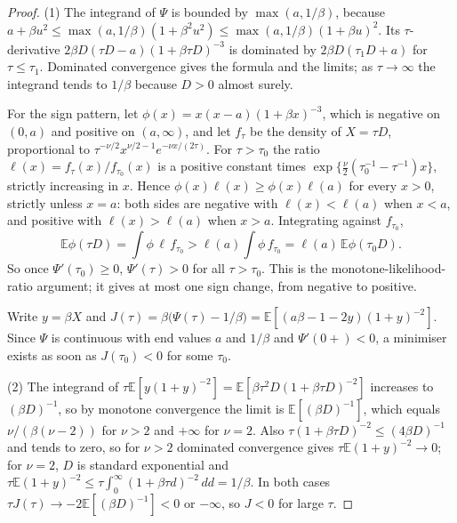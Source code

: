 \documentclass[11pt,a4paper]{article}
\numberwithin{equation}{section}
\theoremstyle{remark}\newtheorem{remark}[theorem]{Remark}
\newcommand{\E}{\mathbb E}
\begin{document}
\begin{proof}
(1) The integrand of \(\Psi\) is bounded by \(\max(a,1/\beta)\), because
\(a+\beta u^2\le\max(a,1/\beta)(1+\beta^2u^2)\le\max(a,1/\beta)(1+\beta u)^2\). Its
\(\tau\)-derivative \(2\beta D(\tau D-a)(1+\beta\tau D)^{-3}\) is dominated by
\(2\beta D(\tau_1D+a)\) for \(\tau\le\tau_1\). Dominated convergence gives the formula and the
limits; as \(\tau\to\infty\) the integrand tends to \(1/\beta\) because \(D>0\) almost surely.

For the sign pattern, let \(\phi(x)=x(x-a)(1+\beta x)^{-3}\), which is negative on \((0,a)\) and
positive on \((a,\infty)\), and let \(f_\tau\) be the density of \(X=\tau D\),
proportional to \(\tau^{-\nu/2}x^{\nu/2-1}e^{-\nu x/(2\tau)}\). For \(\tau>\tau_0\) the ratio
\(\ell(x)=f_\tau(x)/f_{\tau_0}(x)\) is a positive constant times
\(\exp\{\tfrac\nu2(\tau_0^{-1}-\tau^{-1})x\}\), strictly increasing in \(x\). Hence
\(\phi(x)\ell(x)\ge\phi(x)\ell(a)\) for every \(x>0\), strictly unless \(x=a\): both sides are
negative with \(\ell(x)<\ell(a)\) when \(x<a\), and positive with \(\ell(x)>\ell(a)\) when \(x>a\).
Integrating against \(f_{\tau_0}\),
\[
 \E\phi(\tau D)=\int\phi\,\ell\,f_{\tau_0}>\ell(a)\int\phi\,f_{\tau_0}=\ell(a)\,\E\phi(\tau_0D).
\]
So once \(\Psi'(\tau_0)\ge0\), \(\Psi'(\tau)>0\) for all \(\tau>\tau_0\). This is the
monotone-likelihood-ratio argument; it gives at most one sign change, from negative to positive.

Write \(y=\beta X\) and
\(J(\tau)=\beta\bigl(\Psi(\tau)-1/\beta\bigr)=\E[(a\beta-1-2y)(1+y)^{-2}]\).
Since \(\Psi\) is continuous with end values \(a\) and \(1/\beta\) and \(\Psi'(0+)<0\), a minimiser
exists as soon as \(J(\tau_0)<0\) for some \(\tau_0\).

(2) The integrand of \(\tau\E[y(1+y)^{-2}]=\E[\beta\tau^2D(1+\beta\tau D)^{-2}]\) increases to
\((\beta D)^{-1}\), so by monotone convergence the limit is \(\E[(\beta D)^{-1}]\), which equals
\(\nu/(\beta(\nu-2))\) for \(\nu>2\) and \(+\infty\) for \(\nu=2\). Also
\(\tau(1+\beta\tau D)^{-2}\le(4\beta D)^{-1}\) and tends to zero, so for \(\nu>2\) dominated
convergence gives \(\tau\E(1+y)^{-2}\to0\); for \(\nu=2\), \(D\) is standard exponential and
\(\tau\E(1+y)^{-2}\le\tau\int_0^\infty(1+\beta\tau d)^{-2}\,dd=1/\beta\). In both cases
\(\tau J(\tau)\to-2\E[(\beta D)^{-1}]<0\) or \(-\infty\), so \(J<0\) for large \(\tau\).


\end{proof}
\end{document}
